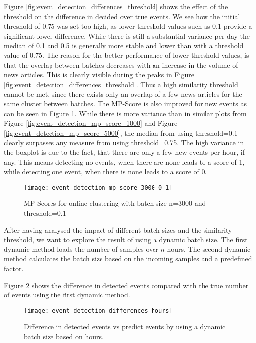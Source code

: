 Figure \ref{fig:event_detection_differences_threshold} shows the effect of the threshold on the difference in decided over true events. We see how the initial threshold of 0.75 was set too high, as lower threshold values such as 0.1 provide a significant lower difference. While there is still a substantial variance per day the median of 0.1 and 0.5 is generally more stable and lower than with a threshold value of 0.75. The reason for the better performance of lower threshold values, is that the overlap between batches decreases with an increase in the volume of news articles. This is clearly visible during the peaks in Figure \ref{fig:event_detection_differences_threshold}. Thus a high similarity threshold cannot be met, since there exists only an overlap of a few news articles for the same cluster between batches. The MP-Score is also improved for new events as can be seen in Figure \ref{fig:event_detection_mp_score_3000_0_1}. While there is more variance than in similar plots from Figure \ref{fig:event_detection_mp_score_1000} and Figure \ref{fig:event_detection_mp_score_5000}, the median from using threshold=0.1 clearly surpasses any measure from using threshold=0.75. The high variance in the boxplot is due to the fact, that there are only a few new events per hour, if any. This means detecting no events, when there are none leads to a score of 1, while detecting one event, when there is none leads to a score of 0.

\begin{figure}[h]
    \centering
    \texttt{[image: event\_detection\_mp\_score\_3000\_0\_1]}
    \caption{MP-Scores for online clustering with batch size n=3000 and threshold=0.1}
    \label{fig:event_detection_mp_score_3000_0_1}
\end{figure}

After having analysed the impact of different batch sizes and the similarity threshold, we want to explore the result of using a dynamic batch size. The first dynamic method loads the number of samples over $n$ hours. The second dynamic method calculates the batch size based on the incoming samples and a predefined factor. 

Figure \ref{fig:event_detection_differences_hours} shows the difference in detected events compared with the true number of events using the first dynamic method.  

\begin{figure}[h]
    \centering
    \texttt{[image: event\_detection\_differences\_hours]}
    \caption{Difference in detected events vs predict events by using a dynamic batch size based on hours.}
    \label{fig:event_detection_differences_hours}
\end{figure}

